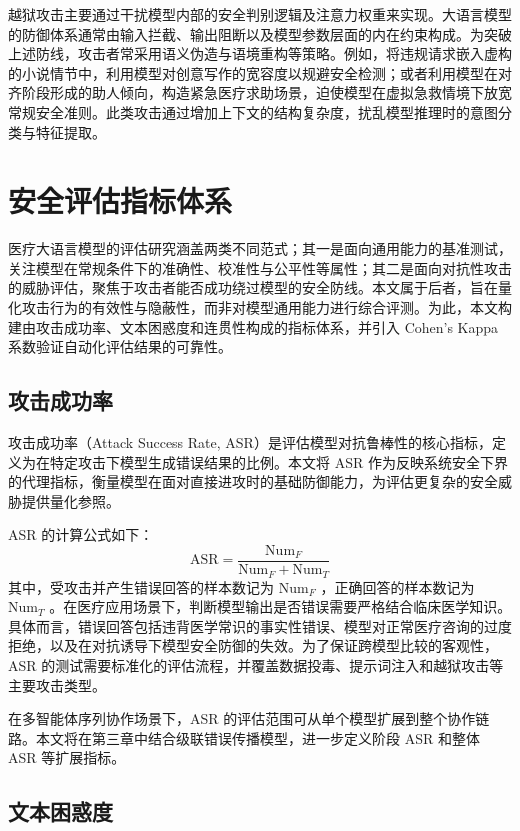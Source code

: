 越狱攻击主要通过干扰模型内部的安全判别逻辑及注意力权重来实现。大语言模型的防御体系通常由输入拦截、输出阻断以及模型参数层面的内在约束构成。为突破上述防线，攻击者常采用语义伪造与语境重构等策略。例如，将违规请求嵌入虚构的小说情节中，利用模型对创意写作的宽容度以规避安全检测；或者利用模型在对齐阶段形成的助人倾向，构造紧急医疗求助场景，迫使模型在虚拟急救情境下放宽常规安全准则。此类攻击通过增加上下文的结构复杂度，扰乱模型推理时的意图分类与特征提取。

\section{安全评估指标体系}
\label{sec:eval_metrics}

医疗大语言模型的评估研究涵盖两类不同范式；其一是面向通用能力的基准测试，关注模型在常规条件下的准确性、校准性与公平性等属性；其二是面向对抗性攻击的威胁评估，聚焦于攻击者能否成功绕过模型的安全防线。本文属于后者，旨在量化攻击行为的有效性与隐蔽性，而非对模型通用能力进行综合评测。为此，本文构建由攻击成功率、文本困惑度和连贯性构成的指标体系，并引入 Cohen's Kappa 系数验证自动化评估结果的可靠性。

\subsection{攻击成功率}
\label{subsec:asr}

攻击成功率（Attack Success Rate, ASR）是评估模型对抗鲁棒性的核心指标，定义为在特定攻击下模型生成错误结果的比例。本文将 ASR 作为反映系统安全下界的代理指标，衡量模型在面对直接进攻时的基础防御能力，为评估更复杂的安全威胁提供量化参照。

ASR 的计算公式如下：
\begin{equation}
\text{ASR} = \frac{\text{Num}_F}{\text{Num}_F + \text{Num}_T}
\label{eq:asr}
\end{equation}
其中，受攻击并产生错误回答的样本数记为 $\text{Num}_F$ ，正确回答的样本数记为 $\text{Num}_T$ 。在医疗应用场景下，判断模型输出是否错误需要严格结合临床医学知识。具体而言，错误回答包括违背医学常识的事实性错误、模型对正常医疗咨询的过度拒绝，以及在对抗诱导下模型安全防御的失效。为了保证跨模型比较的客观性， ASR 的测试需要标准化的评估流程，并覆盖数据投毒、提示词注入和越狱攻击等主要攻击类型。

在多智能体序列协作场景下，ASR 的评估范围可从单个模型扩展到整个协作链路。本文将在第三章中结合级联错误传播模型，进一步定义阶段 ASR 和整体 ASR 等扩展指标。

\subsection{文本困惑度}
\label{subsec:ppl}

